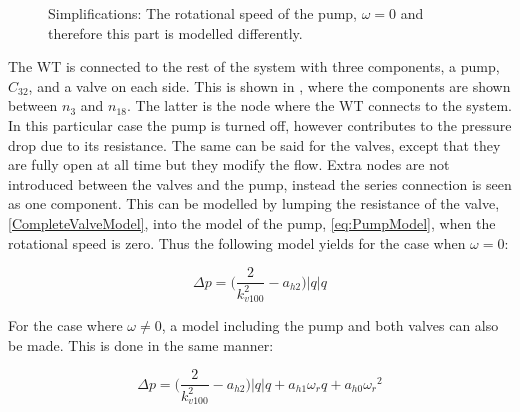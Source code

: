 \begin{figure}[H]
\centering
   
  \label{fig:subsys_1}
%   
\caption{Simplifications: The rotational speed of the pump, $\omega = 0$ and therefore this part is modelled differently.}
\end{figure}

The WT is connected to the rest of the system with three components, a pump, $C_{32}$, and a valve on each side. This is shown in , where the components are shown between $n_3$ and $n_{18}$. 
The latter is the node where the WT connects to the system. In this particular case the pump is turned off, however contributes to the pressure drop due to its resistance. The same can be said for the valves, except that they are fully open at all time but they modify the flow. Extra nodes are not introduced between the valves and the pump, instead the series connection is seen as one component. This can be modelled by lumping the resistance of the valve, \eqref{CompleteValveModel}, into the model of the pump, \eqref{eq:PumpModel}, when the rotational speed is zero. Thus the following model yields for the case when $\omega = 0$:

\begin{equation}
  \Delta p = \Big(\frac{2}{k_{v100}^2} - a_{h2}\Big)|q| q 
  \label{omega_zero}
\end{equation}

For the case where $\omega \neq 0$, a model including the pump and both valves can also be made. This is done in the same manner: 

\begin{equation}
  \Delta p = \Big(\frac{2}{k_{v100}^2} - a_{h2}\Big)|q| q  + a_{h1} \omega_r q + a_{h0}{\omega_r}^2
  \label{omega_notzero}
\end{equation}


